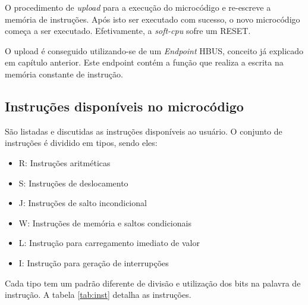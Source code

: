 \documentclass[11pt]{report}
\begin{document}
O procedimento de \textit{upload} para a execução do microcódigo e re-escreve a memória de instruções. Após isto ser executado com sucesso, o novo microcódigo começa a ser executado. Efetivamente, a \textit{soft-cpu} sofre um RESET.

O upload é conseguido utilizando-se de um \textit{Endpoint} HBUS, conceito já explicado em capítulo anterior. Este endpoint contém a função que realiza a escrita na memória constante de instrução.

\subsection{Instruções disponíveis no microcódigo}

São listadas e discutidas as instruções disponíveis ao usuário. O conjunto de instruções é dividido em tipos, sendo eles:

\begin{itemize}

\item R: Instruções aritméticas
\item S: Instruções de deslocamento
\item J: Instruções de salto incondicional
\item W: Instruções de memória e saltos condicionais
\item L: Instrução para carregamento imediato de valor
\item I: Instrução para geração de interrupções

\end{itemize}

Cada tipo tem um padrão diferente de divisão e utilização dos bits na palavra de instrução. A tabela \ref{tab:inst} detalha as instruções.
\end{document}
